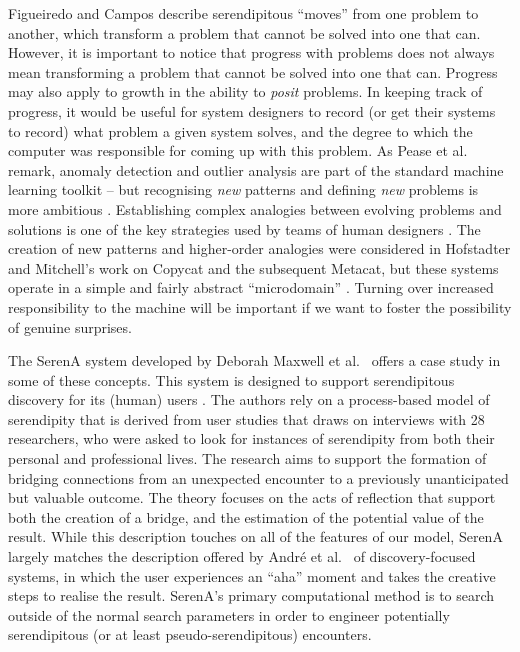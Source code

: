 Figueiredo and Campos \citeyear{Figueiredo2001} describe serendipitous ``moves'' from one
problem to another, which transform a problem that cannot be solved
into one that can.  
However, it is important to notice that progress with problems does not always mean transforming a
problem that cannot be solved into one that can.  Progress may also
apply to growth in the ability to \emph{posit} problems.  In keeping
track of progress, it would be useful for system designers to record
(or get their systems to record) what problem a given system solves,
and the degree to which the computer was responsible for coming up
with this problem.
%
As Pease et al. \citeyearpar[p. 69]{pease2013discussion} remark, anomaly detection and
outlier analysis are part of the standard machine learning toolkit --
but recognising \emph{new} patterns and defining \emph{new} problems
is more ambitious \cite{von2003cybernetics}.  Establishing complex
analogies between evolving problems and solutions is one of the key
strategies used by teams of human designers
\cite{Analogical-problem-evolution-DCC}.  The creation of new patterns
and higher-order analogies were considered in Hofstadter and
Mitchell's work on {\sf Copycat} and the subsequent {\sf Metacat}, but
these systems operate in a simple and fairly abstract ``microdomain''
\cite{hofstadter1994copycat,DBLP:journals/jetai/Marshall06}.
%
Turning over increased responsibility to the machine will be important
if we want to foster the possibility of genuine surprises.

The {\sf SerenA} system developed by Deborah Maxwell et
al.~\citeyear{maxwell2012designing} offers a case study in some
of these concepts.  This system is designed to support
serendipitous discovery for its (human) users
\cite{forth2013serena}.  The authors rely on a process-based
model of serendipity \cite{Makri2012,Makri2012a} that is derived
from user studies that draws on interviews with 28 researchers,
who were asked to look for instances of serendipity from both
their personal and professional lives.  The research aims to
support the formation of bridging connections from an unexpected
encounter to a previously unanticipated but valuable outcome.
The theory focuses on the acts of reflection that support both
the creation of a bridge, and the estimation of the potential
value of the result.
%
While this description touches on all of the features of our model, {\sf
  SerenA} largely matches the description offered by Andr{\'e} et
al.~\citeyear{andre2009discovery} of discovery-focused systems, in which
the user experiences an ``aha'' moment and takes the
creative steps to realise the result.  {\sf SerenA}'s primary computational method is to
search outside of the normal search parameters in order to engineer
potentially serendipitous (or at least pseudo-serendipitous)
encounters.

